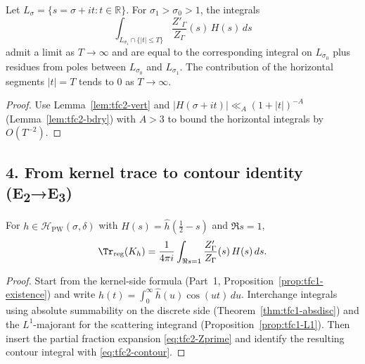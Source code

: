 \begin{lemma}\relax\hspace{0pt}
\label{lem:tfc2-horiz} %
Let $L_\sigma=\{s=\sigma+it: t\in\mathbb{R}\}$. For $\sigma_1>\sigma_0>1$, the integrals
\[
\int_{L_{\sigma_1}\cap\{ |t|\le T\}}\frac{Z'_\Gamma}{Z_\Gamma}(s)\,H(s)\,ds
\]
admit a limit as $T\to\infty$ and are equal to the corresponding integral on $L_{\sigma_0}$ plus residues from poles between $L_{\sigma_0}$ and $L_{\sigma_1}$. The contribution of the horizontal segments $|t|=T$ tends to $0$ as $T\to\infty$.\relax\hspace{0pt}
\end{lemma}

\begin{proof}\relax\hspace{0pt}
Use Lemma~\ref{lem:tfc2-vert} and $|H(\sigma+it)|\ll_A (1+|t|)^{-A}$ (Lemma~\ref{lem:tfc2-bdry}) with $A>3$ to bound the horizontal integrals by $O(T^{-2})$.\relax\hspace{0pt}
\end{proof}

\subsection*{4. From kernel trace to contour identity (E\textsubscript{2}→E\textsubscript{3})}\relax\hspace{0pt}
\label{subsec:tfc2-E2E3} %

\begin{theorem}\relax\hspace{0pt}
\label{thm:tfc2-contour} %
For $h\in\mathcal{H}_{\mathrm{PW}}(\sigma,\delta)$ with $H(s)=\widehat{h}(\tfrac12-s)$ and $\Re s=1$,
\begin{equation}\relax\hspace{0pt}
\label{eq:tfc2-contour}\relax\hspace{0pt}
\Tr_{\mathrm{reg}}(K_h)
=\frac{1}{4\pi i}\int_{\Re s=1}\frac{Z'_\Gamma}{Z_\Gamma}(s)\,H(s)\,ds.
\end{equation}
\end{theorem}

\begin{proof}\relax\hspace{0pt}
Start from the kernel-side formula (Part~1, Proposition~\textup{\ref{prop:tfc1-existence}}) and write $h(t)=\int_0^\infty \widehat{h}(u)\cos(ut)\,du$. Interchange integrals using absolute summability on the discrete side (Theorem~\textup{\ref{thm:tfc1-absdisc}}) and the $L^1$-majorant for the scattering integrand (Proposition~\textup{\ref{prop:tfc1-L1}}). Then insert the partial fraction expansion \eqref{eq:tfc2-Zprime} and identify the resulting contour integral with \eqref{eq:tfc2-contour}.\relax\hspace{0pt}
\end{proof}

